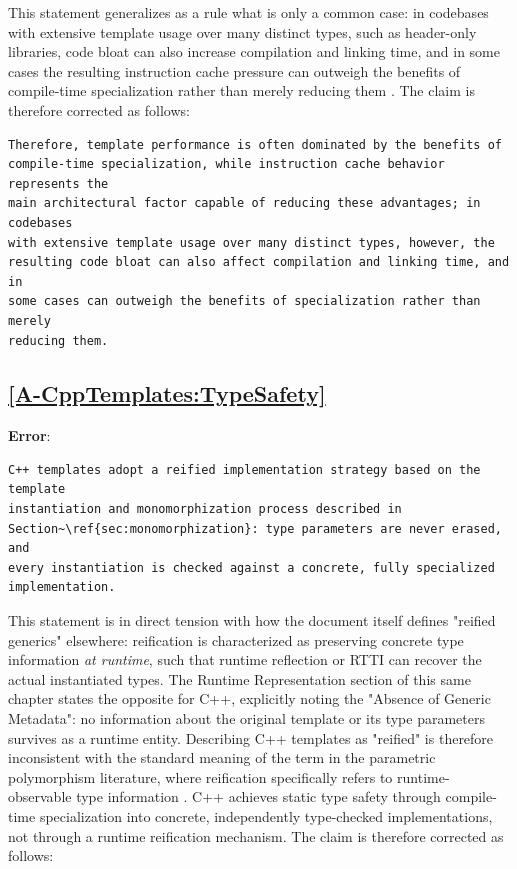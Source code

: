 \documentclass[11pt]{report}
\begin{document}
This statement generalizes as a rule what is only a common case: in codebases
with extensive template usage over many distinct types, such as header-only
libraries, code bloat can also increase compilation and linking time, and in
some cases the resulting instruction cache pressure can outweigh the benefits
of compile-time specialization rather than merely reducing them
\cite{cpp_templates2017}. The claim is therefore corrected as follows:

\begin{Verbatim}[breaklines=true]
Therefore, template performance is often dominated by the benefits of
compile-time specialization, while instruction cache behavior represents the
main architectural factor capable of reducing these advantages; in codebases
with extensive template usage over many distinct types, however, the
resulting code bloat can also affect compilation and linking time, and in
some cases can outweigh the benefits of specialization rather than merely
reducing them.
\end{Verbatim}

\subsection*{\hyperref[A-CppTemplates:TypeSafety]{\ref*{A-CppTemplates:TypeSafety} }}
\noindent\textbf{Error}:

\begin{Verbatim}[breaklines=true]
C++ templates adopt a reified implementation strategy based on the template
instantiation and monomorphization process described in
Section~\ref{sec:monomorphization}: type parameters are never erased, and
every instantiation is checked against a concrete, fully specialized
implementation.
\end{Verbatim}

This statement is in direct tension with how the document itself defines
"reified generics" elsewhere: reification is characterized as preserving
concrete type information \emph{at runtime}, such that runtime reflection or
RTTI can recover the actual instantiated types. The Runtime Representation
section of this same chapter states the opposite for C++, explicitly noting
the "Absence of Generic Metadata": no information about the original template
or its type parameters survives as a runtime entity. Describing C++ templates
as "reified" is therefore inconsistent with the standard meaning of the term
in the parametric polymorphism literature, where reification specifically
refers to runtime-observable type information \cite{cardelli1985}. C++
achieves static type safety through compile-time specialization into
concrete, independently type-checked implementations, not through a runtime
reification mechanism. The claim is therefore corrected as follows:
\end{document}
